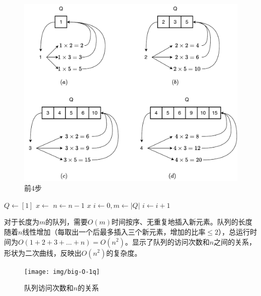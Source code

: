 \documentclass[b5paper, punct=kaiming]{ctexart}
\begin{document}
\begin{figure}[htbp]
  \centering
  \includegraphics[scale=0.5]{img/regular-num-1q}
  \caption{前4步}
  \label{fig:queues}
\end{figure}

\begin{algorithmic}[1]
  \State $Q \gets [1]$
    \State $x \gets$ 
    \State {}
    \State {}
    \State {}
    \State $n \gets n-1$
  \EndWhile
  \State \Return $x$
\EndFunction
\Statex
{}
  \State $i \gets 0, m \gets |Q|$
    \State $i \gets i + 1$
  \EndWhile
    \State {}
  \EndIf
\EndFunction
\end{algorithmic}

对于长度为$m$的队列，需要$O(m)$时间按序、无重复地插入新元素。队列的长度随着$n$线性增加（每取出一个后最多插入三个新元素，增加的比率$\leq 2$），总运行时间为$O(1 + 2 + 3 + ... + n) = O(n^2)$。显示了队列的访问次数和$n$之间的关系，形状为二次曲线，反映出$O(n^2)$的复杂度。

\begin{figure}[htbp]
  \centering
  \texttt{[image: img/big-O-1q]}
  \caption{队列访问次数和$n$的关系}
  \label{fig:big-O-1q}
\end{figure}
\end{document}
